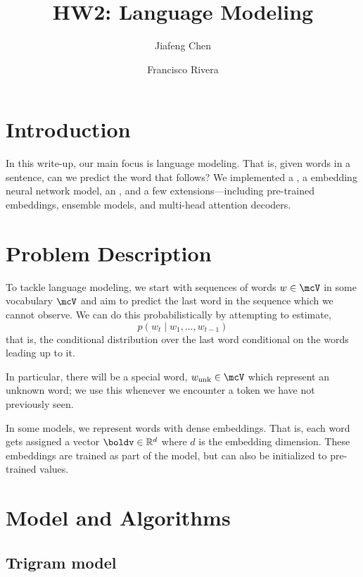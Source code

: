 \documentclass[12pt]{article}
\title{HW2: Language Modeling}
\author{Jiafeng Chen \and
Francisco Rivera}
\begin{document}
\maketitle{}
\section{Introduction}
In this write-up, our main focus is language modeling. That is, given words in a
sentence, can we predict the word that follows? We implemented a
, a embedding neural network model, an
, and a few extensions---including pre-trained embeddings,
ensemble models, and multi-head attention decoders.

\section{Problem Description}


To tackle language modeling, we start with sequences of words $w \in \mcV$ in
some vocabulary $\mcV$ and aim to predict the last word in the sequence which we
cannot observe. We can do this probabilistically by attempting to estimate,
\begin{equation}
p(w_t \mid w_1, \ldots, w_{t-1})
\label{eq:probabilistic}
\end{equation}
that is, the conditional distribution over the last word conditional on the
words leading up to it.

In particular, there will be a special word, $w_\text{unk} \in \mcV$ which
represent an unknown word; we use this whenever we encounter a token we have not
previously seen.

In some models, we represent words with dense embeddings. That is, each word
gets assigned a vector $\boldv \in \mathbb{R}^d$ where $d$ is the embedding
dimension. These embeddings are trained as part of the model, but can also be
initialized to pre-trained values.

\section{Model and Algorithms}


\subsection{Trigram model}
\label{subsec:trigram}
\end{document}
